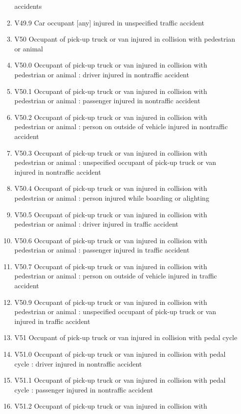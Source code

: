 \documentclass[
]{scrartcl}
\begin{document}
\begin{itemize}
\begin{enumerate}
    accidents
  \item
    V49.9 Car occupant {[}any{]} injured in unspecified traffic accident
  \item
    V50 Occupant of pick-up truck or van injured in collision with
    pedestrian or animal
  \item
    V50.0 Occupant of pick-up truck or van injured in collision with
    pedestrian or animal : driver injured in nontraffic accident
  \item
    V50.1 Occupant of pick-up truck or van injured in collision with
    pedestrian or animal : passenger injured in nontraffic accident
  \item
    V50.2 Occupant of pick-up truck or van injured in collision with
    pedestrian or animal : person on outside of vehicle injured in
    nontraffic accident
  \item
    V50.3 Occupant of pick-up truck or van injured in collision with
    pedestrian or animal : unspecified occupant of pick-up truck or van
    injured in nontraffic accident
  \item
    V50.4 Occupant of pick-up truck or van injured in collision with
    pedestrian or animal : person injured while boarding or alighting
  \item
    V50.5 Occupant of pick-up truck or van injured in collision with
    pedestrian or animal : driver injured in traffic accident
  \item
    V50.6 Occupant of pick-up truck or van injured in collision with
    pedestrian or animal : passenger injured in traffic accident
  \item
    V50.7 Occupant of pick-up truck or van injured in collision with
    pedestrian or animal : person on outside of vehicle injured in
    traffic accident
  \item
    V50.9 Occupant of pick-up truck or van injured in collision with
    pedestrian or animal : unspecified occupant of pick-up truck or van
    injured in traffic accident
  \item
    V51 Occupant of pick-up truck or van injured in collision with pedal
    cycle
  \item
    V51.0 Occupant of pick-up truck or van injured in collision with
    pedal cycle : driver injured in nontraffic accident
  \item
    V51.1 Occupant of pick-up truck or van injured in collision with
    pedal cycle : passenger injured in nontraffic accident
  \item
    V51.2 Occupant of pick-up truck or van injured in collision with

\end{enumerate}
\end{itemize}
\end{document}
